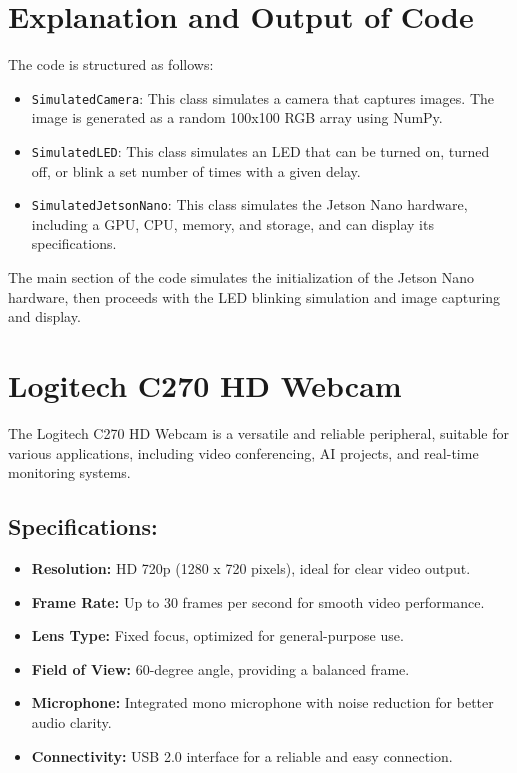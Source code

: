 \section{Explanation and Output of Code}

The code is structured as follows:

\begin{itemize}
	\item \texttt{SimulatedCamera}: This class simulates a camera that captures images. The image is generated as a random 100x100 RGB array using NumPy.
	\item \texttt{SimulatedLED}: This class simulates an LED that can be turned on, turned off, or blink a set number of times with a given delay.
	\item \texttt{SimulatedJetsonNano}: This class simulates the Jetson Nano hardware, including a GPU, CPU, memory, and storage, and can display its specifications.
\end{itemize}

The main section of the code simulates the initialization of the Jetson Nano hardware, then proceeds with the LED blinking simulation and image capturing and display.



\section{Logitech C270 HD Webcam}

The Logitech C270 HD Webcam is a versatile and reliable peripheral, suitable for various applications, including video conferencing, AI projects, and real-time monitoring systems.


\subsection{Specifications:}
\begin{itemize}
	\item \textbf{Resolution:} HD 720p (1280 x 720 pixels), ideal for clear video output.
	\item \textbf{Frame Rate:} Up to 30 frames per second for smooth video performance.
	\item \textbf{Lens Type:} Fixed focus, optimized for general-purpose use.
	\item \textbf{Field of View:} 60-degree angle, providing a balanced frame.
	\item \textbf{Microphone:} Integrated mono microphone with noise reduction for better audio clarity.
	\item \textbf{Connectivity:} USB 2.0 interface for a reliable and easy connection.\cite{LHW:2024}
	
\end{itemize}

